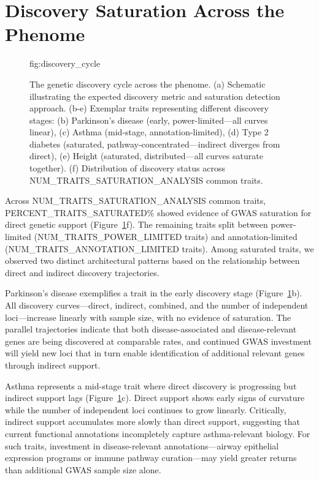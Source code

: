 \section{Discovery Saturation Across the Phenome}\label{sec:results}

\begin{figure}[t!]
    \centering
    {{fig:discovery_cycle}}
    \caption{The genetic discovery cycle across the phenome. (a) Schematic illustrating the expected discovery metric and saturation detection approach. (b-e) Exemplar traits representing different discovery stages: (b) Parkinson's disease (early, power-limited---all curves linear), (c) Asthma (mid-stage, annotation-limited), (d) Type 2 diabetes (saturated, pathway-concentrated---indirect diverges from direct), (e) Height (saturated, distributed---all curves saturate together). (f) Distribution of discovery status across {{NUM_TRAITS_SATURATION_ANALYSIS}} common traits.}
    \label{fig:discovery-cycle}
\end{figure}

Across {{NUM_TRAITS_SATURATION_ANALYSIS}} common traits, {{PERCENT_TRAITS_SATURATED}}\% showed evidence of GWAS saturation for direct genetic support (Figure~\ref{fig:discovery-cycle}f). The remaining traits split between power-limited ({{NUM_TRAITS_POWER_LIMITED}} traits) and annotation-limited ({{NUM_TRAITS_ANNOTATION_LIMITED}} traits). Among saturated traits, we observed two distinct architectural patterns based on the relationship between direct and indirect discovery trajectories.

Parkinson's disease exemplifies a trait in the early discovery stage (Figure~\ref{fig:discovery-cycle}b). All discovery curves---direct, indirect, combined, and the number of independent loci---increase linearly with sample size, with no evidence of saturation. The parallel trajectories indicate that both disease-associated and disease-relevant genes are being discovered at comparable rates, and continued GWAS investment will yield new loci that in turn enable identification of additional relevant genes through indirect support.

Asthma represents a mid-stage trait where direct discovery is progressing but indirect support lags (Figure~\ref{fig:discovery-cycle}c). Direct support shows early signs of curvature while the number of independent loci continues to grow linearly. Critically, indirect support accumulates more slowly than direct support, suggesting that current functional annotations incompletely capture asthma-relevant biology. For such traits, investment in disease-relevant annotations---airway epithelial expression programs or immune pathway curation---may yield greater returns than additional GWAS sample size alone.

